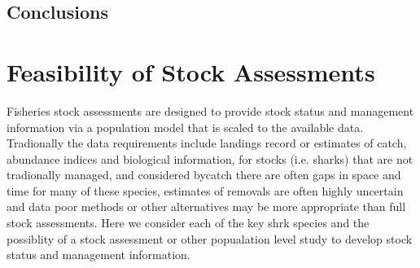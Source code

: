 \documentclass[12pt]{SCreport}
\begin{document}
\subsection{Conclusions}
      
 \clearpage     
      
\section{Feasibility of Stock Assessments}
Fisheries stock assessments are designed to provide stock status and management information via a population model that is scaled to the   available data.  Tradionally the data requirements include landings record or estimates of catch, abundance indices and   biological information, for stocks (i.e. sharks) that are not tradionally managed, and considered bycatch there are often gaps in space and time for many of these species, estimates of removals are often highly uncertain and data poor methods or other alternatives may be more appropriate than full stock assessments.  Here we consider each of the key shrk species and the possiblity of a stock assessment or other popualation level study to develop stock status and management information.
\end{document}
